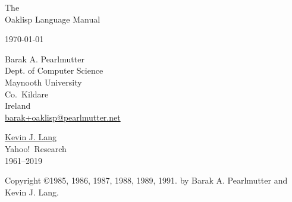 %
%
%


\begin{titlepage}

\begin{center}

\vspace*{1in}

\Huge
 The \\
 Oaklisp Language Manual \\

\vspace{.5in}

\large
 \today \\

\vspace{.25in}


\vspace{.5in}

\Large
 Barak A. Pearlmutter \\
\large
 Dept. of Computer Science\\
 Maynooth University\\
 Co.\ Kildare\\
 Ireland\\
 \href{mailto:barak+oaklisp@pearlmutter.net}{barak+oaklisp@pearlmutter.net}

\vspace{.5in}

\Large
 \href{https://docs.google.com/document/d/1VAebgWKorNpPnE6ClFqxQ5ZTUm2OtTg9C0M85qDCirU}{Kevin J. Lang} \\
\large
 Yahoo!\ Research \\
 1961--2019

\vfill


\end{center}

\end{titlepage}


\thispagestyle{empty}

\vspace*{6in}

\normalsize
\noindent Copyright \copyright 1985, 1986, 1987, 1988, 1989, 1991.
 by Barak A. Pearlmutter and Kevin J. Lang.

\newpage



